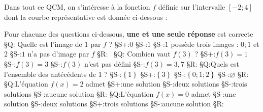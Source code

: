 
%
Dans tout ce QCM, on s'intéresse à la fonction $f$ définie sur l'intervalle $\left[-2 ; 4\right]$ dont la courbe représentative est donnée ci-dessous :

\begin{center}
\end{center}
Pour chacune des questions ci-dessous, \textbf{une et une seule réponse} est correcte
§Q: Quelle est l'image de $1$ par $f$ ?
§S+:$0$
§S-:$1$
§S-:$1$ possède trois images : $0 ; 1$ et $2$
§S-:$1$ n'a pas d'image par $f$
§R:~
§Q:  Combien vaut $f\left(3\right)$ ?
§S+:$f\left(3\right)=1$
§S-:$f\left(3\right)=3$
§S-:$f\left(3\right)$ n'est pas défini
§S-:$f\left(3\right)=3,7$
§R:
§Q:Quels est l'ensemble des antécédents de $1$ ?
§S-:$\left\{1\right\}$
§S+:$\left\{3\right\}$
§S-:$\left\{0 ; 1 ; 2\right\}$
§S-:$\varnothing$
§R:
§Q:L'équation $f\left(x\right)=2$ admet
§S+:une solution
§S-:deux solutions
§S-:trois solutions
§S-:aucune solution
§R:
§Q:L'équation $f\left(x\right)=0$ admet
§S-:une solution
§S-:deux solutions
§S+:trois solutions
§S-:aucune solution
§R:
